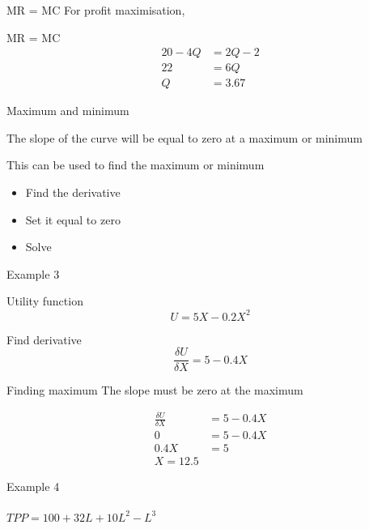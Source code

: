 \documentclass[14pt,xcolor=pdftex,dvipsnames,table]{beamer}
\begin{document}
\begin{frame}{MR = MC}
For profit maximisation, 
\begin{block}{MR = MC}
\begin{align*}
20 - 4Q &= 2Q - 2\\
22 &= 6Q\\
Q &= 3.67
\end{align*}
\end{block}
\end{frame}

\begin{frame}{Maximum and minimum}
\begin{block}{}
The slope of the curve will be equal to zero at a maximum or minimum
\end{block}
\pause
This can be used to find the maximum or minimum
\pause
\begin{itemize}[<+-| alert@+>]
\item Find the derivative
\item Set it equal to zero
\item Solve
\end{itemize}
\end{frame}

\begin{frame}{Example 3}
\begin{block}{Utility function}
\begin{equation*}
U = 5X - 0.2X^2
\end{equation*}
\end{block}
\begin{block}{Find derivative}
\begin{equation*}
\frac{\delta U}{\delta X} = 5 - 0.4X
\end{equation*}
\end{block}
\end{frame}

\begin{frame}{Finding maximum}
The slope must be zero at the maximum
\pause
\begin{block}{}
\begin{align*}
\frac{\delta U}{\delta X} &= 5 - 0.4X\\
0 &= 5 - 0.4X\\
0.4X &= 5\\
X = 12.5
\end{align*}
\end{block}
\end{frame}

\begin{frame}{Example 4}
\framesubtitle{$TPP  = 100 + 32L + 10L^2 - L^3$}
\end{frame}
\end{document}
